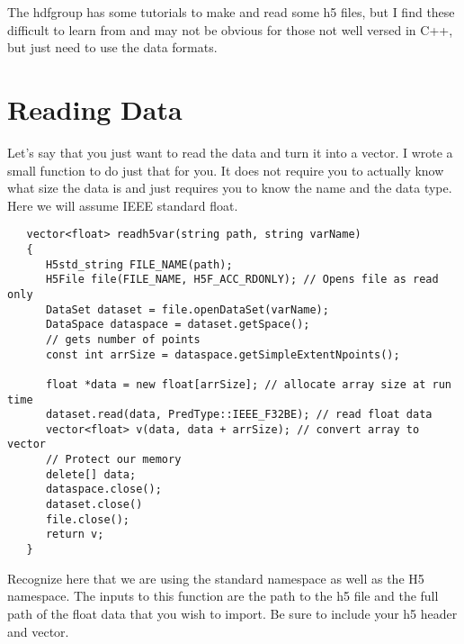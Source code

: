 \documentclass[11pt]{article}   %
\begin{document}
The hdfgroup has some tutorials to make and read some h5 files, but I find these difficult to learn from and may not be obvious for those not well versed
in C++, but just need to use the data formats. 

\section*{Reading Data}
Let's say that you just want to read the data and turn it into a vector. I wrote a small function to do just that for you. It does not require you to actually
know what size the data is and just requires you to know the name and the data type. Here we will assume IEEE standard float.
\begin{tcolorbox} 
   \begin{lstlisting}
   vector<float> readh5var(string path, string varName)
   {
      H5std_string FILE_NAME(path);
      H5File file(FILE_NAME, H5F_ACC_RDONLY); // Opens file as read only
      DataSet dataset = file.openDataSet(varName);
      DataSpace dataspace = dataset.getSpace();
      // gets number of points
      const int arrSize = dataspace.getSimpleExtentNpoints(); 
      
      float *data = new float[arrSize]; // allocate array size at run time
      dataset.read(data, PredType::IEEE_F32BE); // read float data
      vector<float> v(data, data + arrSize); // convert array to vector
      // Protect our memory
      delete[] data;
      dataspace.close();
      dataset.close()
      file.close();
      return v;
   }
   \end{lstlisting}
\end{tcolorbox}
Recognize here that we are using the standard namespace as well as the H5 namespace. The inputs to this function are the path to the h5 file and the full path of the float
data that you wish to import. Be sure to include your h5 header and vector.
\end{document}
